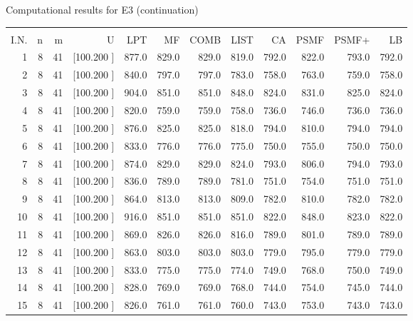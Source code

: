 \documentclass[12pt,a4paper]{article}
\begin{document}
\newpage
\begin{center}
 Computational results for E3 (continuation) {\tiny
\begin{tabular}{r r r r r r r r r r r r}\hline
    &   &   &          &        &        &        &        &        &        &        &       \\[-0.1in]
  I.N.  &  n  &  m  &  U  &  LPT  &  MF  &  COMB  &  LIST  &  CA  & PSMF &PSMF+ & LB \\[0.03in]
\hline
   1&  8& 41&[100.200   ]&   877.0&   829.0&   829.0&   819.0&   792.0&   822.0&   793.0&   792.0\\[-0.02in]
   2&  8& 41&[100.200   ]&   840.0&   797.0&   797.0&   783.0&   758.0&   763.0&   759.0&   758.0\\[-0.02in]
   3&  8& 41&[100.200   ]&   904.0&   851.0&   851.0&   848.0&   824.0&   831.0&   825.0&   824.0\\[-0.02in]
   4&  8& 41&[100.200   ]&   820.0&   759.0&   759.0&   758.0&   736.0&   746.0&   736.0&   736.0\\[-0.02in]
   5&  8& 41&[100.200   ]&   876.0&   825.0&   825.0&   818.0&   794.0&   810.0&   794.0&   794.0\\[-0.02in]
   6&  8& 41&[100.200   ]&   833.0&   776.0&   776.0&   775.0&   750.0&   755.0&   750.0&   750.0\\[-0.02in]
   7&  8& 41&[100.200   ]&   874.0&   829.0&   829.0&   824.0&   793.0&   806.0&   794.0&   793.0\\[-0.02in]
   8&  8& 41&[100.200   ]&   836.0&   789.0&   789.0&   781.0&   751.0&   754.0&   751.0&   751.0\\[-0.02in]
   9&  8& 41&[100.200   ]&   864.0&   813.0&   813.0&   809.0&   782.0&   810.0&   782.0&   782.0\\[-0.02in]
  10&  8& 41&[100.200   ]&   916.0&   851.0&   851.0&   851.0&   822.0&   848.0&   823.0&   822.0\\[-0.02in]
  11&  8& 41&[100.200   ]&   869.0&   826.0&   826.0&   816.0&   789.0&   801.0&   789.0&   789.0\\[-0.02in]
  12&  8& 41&[100.200   ]&   863.0&   803.0&   803.0&   803.0&   779.0&   795.0&   779.0&   779.0\\[-0.02in]
  13&  8& 41&[100.200   ]&   833.0&   775.0&   775.0&   774.0&   749.0&   768.0&   750.0&   749.0\\[-0.02in]
  14&  8& 41&[100.200   ]&   828.0&   769.0&   769.0&   768.0&   744.0&   754.0&   745.0&   744.0\\[-0.02in]
  15&  8& 41&[100.200   ]&   826.0&   761.0&   761.0&   760.0&   743.0&   753.0&   743.0&   743.0\\[-0.02in]

\end{tabular}}
\end{center}
\end{document}
